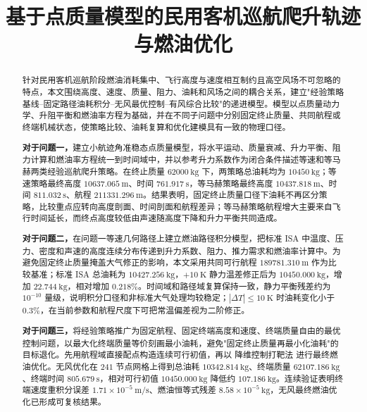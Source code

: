 \documentclass[withoutpreface,bwprint]{cumcmthesis}
\title{基于点质量模型的民用客机巡航爬升轨迹与燃油优化}
\begin{document}

\maketitle

\begin{abstract}
针对民用客机巡航阶段燃油消耗集中、飞行高度与速度相互制约且高空风场不可忽略的特点，本文围绕高度、速度、质量、阻力、油耗和风场之间的耦合关系，建立"经验策略基线--固定路径油耗积分--无风最优控制--有风综合比较"的递进模型。模型以点质量动力学、升阻平衡和燃油率方程为基础，并在不同子问题中分别固定终止质量、共同航程或终端机械状态，使策略比较、油耗复算和优化建模具有一致的物理口径。

\textbf{对于问题一，}建立小航迹角准稳态点质量模型，将水平运动、质量衰减、升力平衡、阻力计算和燃油率方程统一到时间域中，并以参考升力系数作为闭合条件描述等速和等马赫两类经验巡航爬升策略。在终止质量 $62000\ \mathrm{kg}$ 下，两策略总油耗均为 $10450\ \mathrm{kg}$；等速策略最终高度 $10637.065\ \mathrm{m}$、时间 $761.917\ \mathrm{s}$，等马赫策略最终高度 $10437.818\ \mathrm{m}$、时间 $811.032\ \mathrm{s}$、航程 $211331.296\ \mathrm{m}$。结果表明，固定终止质量口径下油耗不再区分策略，比较重点应转向高度剖面、时间剖面和航程差异；等马赫策略航程增大主要来自飞行时间延长，而终点高度较低由声速随高度下降和升力平衡共同造成。

\textbf{对于问题二，}在问题一等速几何路径上建立燃油路径积分模型，把标准 ISA 中温度、压力、密度和声速的高度连续分布传递到升力系数、阻力、推力需求和燃油率计算中。为避免固定终止质量掩盖大气修正的影响，本文采用共同可行航程 $189781.310\ \mathrm{m}$ 作为比较基准；标准 ISA 总油耗为 $10427.256\ \mathrm{kg}$，$+10\ \mathrm{K}$ 静力温差修正后为 $10450.000\ \mathrm{kg}$，增加 $22.744\ \mathrm{kg}$，相对增加 $0.218\%$。时间域和路径域复算保持一致，静力平衡残差约为 $10^{-10}$ 量级，说明积分口径和非标准大气处理均较稳定；$|\Delta T|\leq10\ \mathrm{K}$ 时油耗变化小于 $0.3\%$，在当前参数和航程尺度下可把常温偏差视为二阶修正。

\textbf{对于问题三，}将经验策略推广为固定航程、固定终端高度和速度、终端质量自由的最优控制问题，以最大化终端质量等价刻画最小油耗，避免"固定终止质量再最小化油耗"的目标退化。先用航程域直接配点构造连续可行初值，再以 降维控制打靶法 进行最终燃油优化。无风优化在 $241$ 节点网格上得到总油耗 $10342.814\ \mathrm{kg}$、终端质量 $62107.186\ \mathrm{kg}$、终端时间 $805.679\ \mathrm{s}$，相对可行初值 $10450.000\ \mathrm{kg}$ 降低约 $107.186\ \mathrm{kg}$。连续验证表明终端速度重积分误差 $1.71\times10^{-5}\ \mathrm{m/s}$、燃油恒等式残差 $8.58\times10^{-5}\ \mathrm{kg}$，无风最终燃油优化已形成可复核结果。


\end{abstract}
\end{document}
